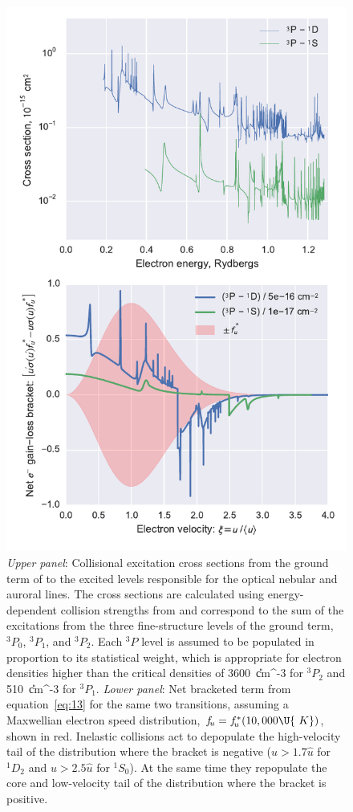 \documentclass{emulateapj}
\newcommand\pcc{\U{cm^{-3}}}
\newcommand\ubar{\ensuremath{\hat{u}}}
\begin{document}
\begin{figure}
  \centering
  \includegraphics[width=0.9\linewidth]{storey_oiii}
  \caption{\textit{Upper panel}: Collisional excitation cross sections
    from the ground term of \oiii{} to the excited levels responsible
    for the optical nebular and auroral lines.  The cross sections are
    calculated using energy-dependent collision strengths from
    \citet{Storey:2014a} and correspond to the sum of the excitations
    from the three fine-structure levels of the ground term,
    \({}^3P_{0}\),
    \({}^3P_{1}\),
    and \({}^3P_{2}\).
    Each \({}^3P\)
    level is assumed to be populated in proportion to its statistical
    weight, which is appropriate for electron densities higher
    than the critical densities of 3600~\pcc{} for \({}^3P_{2}\)
    and 510~\pcc{} for \({}^3P_{1}\).
    \textit{Lower panel}: Net bracketed term from
    equation~\eqref{eq:13} for the same two \oiii{} transitions,
    assuming a Maxwellian electron speed distribution,
    \(\fu = \fu^*(10,000\U{\ K})\),
    shown in red.  Inelastic collisions act to depopulate the
    high-velocity tail of the distribution where the bracket is
    negative (\(u > 1.7 \ubar\)
    for \({}^1D_2\)
    and \(u > 2.5 \ubar\)
    for \({}^1S_0\)).
    At the same time they repopulate the core and low-velocity tail of
    the distribution where the bracket is positive.  }
  \label{fig:storey-sigma}
\end{figure}
\end{document}

